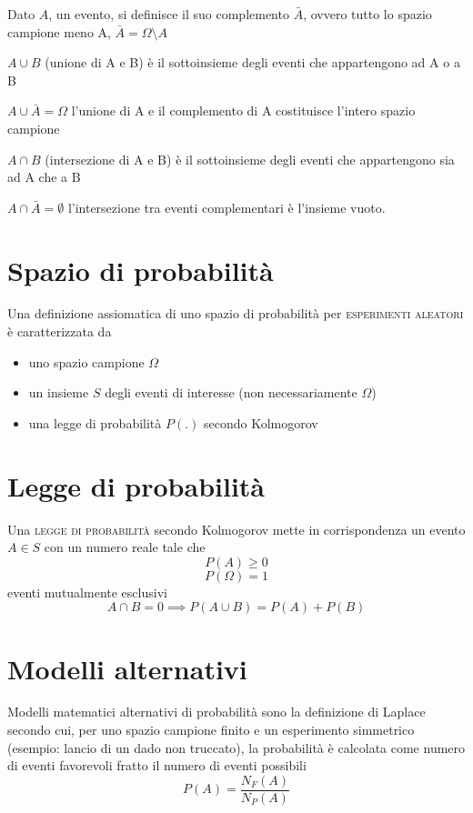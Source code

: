 Dato $A$, un evento, si definisce il suo complemento $\bar{A}$, ovvero tutto lo spazio campione meno A, $\bar{A}=\Omega\setminus A$

$A\cup B$ (unione di A e B) è il sottoinsieme degli eventi che appartengono ad A o a B

$A\cup\bar{A}=\Omega$ l'unione di A e il complemento di A costituisce l'intero spazio campione

$A\cap B$ (intersezione di A e B) è il sottoinsieme degli eventi che appartengono sia ad A che a B

$A\cap\bar{A}=\emptyset$ l'intersezione tra eventi complementari è l'insieme vuoto.

\section{Spazio di probabilità}
Una definizione assiomatica di uno spazio di probabilità per \textsc{esperimenti aleatori} è caratterizzata da 
\begin{itemize}
\item uno spazio campione $\Omega$
\item un insieme $S$ degli eventi di interesse (non necessariamente $\Omega$)
\item una legge di probabilità $P(.)$ secondo Kolmogorov
\end{itemize}

\section{Legge di probabilità}
Una \textsc{legge di probabilità} secondo Kolmogorov mette in corrispondenza un evento $A\in S$ con un numero reale tale che
\begin{equation}P(A)\geq 0\end{equation}
\begin{equation}P(\Omega)=1\end{equation}
eventi mutualmente esclusivi \begin{equation}A\cap B=0\implies P(A\cup B)=P(A)+P(B)\end{equation}

\section{Modelli alternativi}
Modelli matematici alternativi di probabilità sono la definizione di Laplace secondo cui, per uno spazio campione finito e un esperimento simmetrico (esempio: lancio di un dado non truccato), la probabilità è calcolata come numero di eventi favorevoli fratto il numero di eventi possibili
\begin{equation}
P(A)=\frac{N_F(A)}{N_P(A)}
\end{equation}

